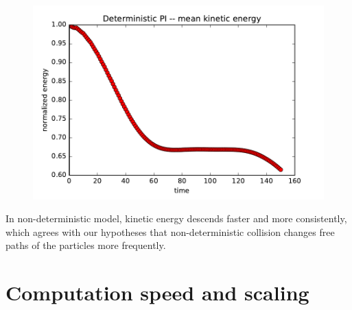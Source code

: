 \begin{figure}[H]
 \centering 
 \includegraphics[width=1\textwidth]{./img/tgv_dete}
\end{figure}

In non-deterministic model, kinetic energy descends faster and more consistently, which agrees with our hypotheses that non-deterministic collision changes free paths of the particles more frequently.

\section{Computation speed and scaling}











